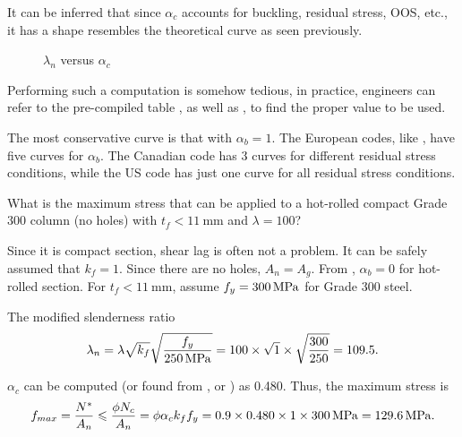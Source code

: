 It can be inferred that since $\alpha_c$ accounts for buckling, residual stress, OOS, etc., it has a shape resembles the theoretical curve as seen previously.
\begin{figure}[H]
\centering

\caption{$\lambda_n$ versus $\alpha_c$}\label{fig:alpha_c}
\end{figure}

Performing such a computation is somehow tedious, in practice, engineers can refer to the pre-compiled table , as well as , to find the proper value to be used.

The most conservative curve is that with $\alpha_b=1$. The European codes, like \NZSSTEEL{}, have five curves for $\alpha_b$. The Canadian code has 3 curves for different residual stress conditions, while the US code has just one curve for all residual stress conditions.
\begin{exmp}
What is the maximum stress that can be applied to a hot-rolled compact Grade 300 column (no holes) with $t_f<\SI{11}{\mm}$ and $\lambda=100$?
\end{exmp}
\begin{solution}
Since it is compact section, shear lag is often not a problem. It can be safely assumed that $k_f=1$. Since there are no holes, $A_n=A_g$. From , $\alpha_b=0$ for hot-rolled section. For $t_f<\SI{11}{\mm}$, assume $f_y=\SI{300}{\mega\pascal}$ for Grade 300 steel.

The modified slenderness ratio
\begin{gather*}
\lambda_n=\lambda\sqrt{k_f}\sqrt{\dfrac{f_y}{\SI{250}{\mega\pascal}}}=100\times\sqrt{1}\times\sqrt{\dfrac{300}{250}}=109.5.
\end{gather*}

$\alpha_c$ can be computed (or found from , or ) as \num{0.480}. Thus, the maximum stress is
\begin{gather*}
f_{max}=\dfrac{N^*}{A_n}\leqslant\dfrac{\phi{}N_c}{A_n}=\phi\alpha_ck_ff_y=0.9\times0.480\times1\times\SI{300}{\mega\pascal}=\SI{129.6}{\mega\pascal}.
\end{gather*}
\end{solution}
